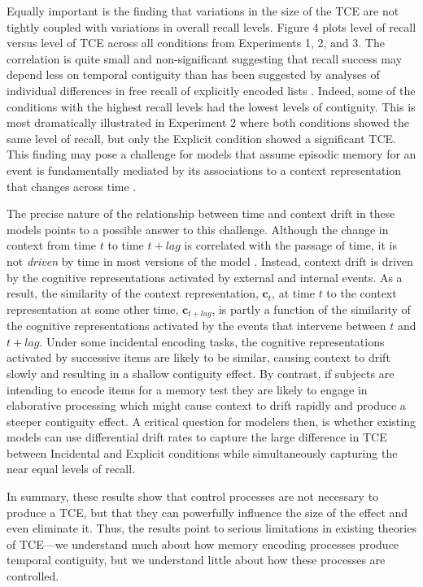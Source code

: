 \documentclass[jou,natbib,floatsintext]{apa6} %
\begin{document}
Equally important is the finding that variations in the size of the TCE are not tightly coupled with variations in overall recall levels. Figure 4 plots level of recall versus level of TCE across all conditions from Experiments 1, 2, and 3. \label{done-12} \color{red} The correlation is quite small and non-significant \color{black} suggesting that recall success may depend less on temporal contiguity than has been suggested by analyses of individual differences in free recall of explicitly encoded lists \citep{SedeEtal10,HealEtal14}. Indeed, some of the conditions with the highest recall levels had the lowest levels of contiguity. This is most dramatically illustrated in Experiment 2 where both conditions showed the same level of recall, but only the Explicit condition showed a significant TCE. This finding may pose a challenge for models that assume episodic memory for an event is fundamentally mediated by its associations to a context representation that changes across time \citep[e.g.,][]{LohnEtal14,HealKaha15}. 

The precise nature of the relationship between time and context drift in these models points to a possible answer to this challenge. Although the change in context from time $t$ to time $t+lag$ is correlated with the passage of time, it is not \emph{driven} by time in most versions of the model \citep[but see][for a model in which drift is driven by time]{HowaEtal14a}. Instead, context drift is driven by the cognitive representations activated by external and internal events. As a result, the similarity of the context representation, $\mathbf{c}_t$, at time $t$ to the context representation at some other time, $\mathbf{c}_{t+lag}$, is partly a function of the similarity of the cognitive representations activated by the events that intervene between $t$ and $t+lag$. Under some incidental encoding tasks, the cognitive representations activated by successive items are likely to be similar, causing context to drift slowly and resulting in a shallow contiguity effect. By contrast, if subjects are intending to encode items for a memory test they are likely to engage in elaborative processing which might cause context to drift rapidly and produce a steeper contiguity effect. A critical question for modelers then, is whether existing models can use differential drift rates to capture the large difference in TCE between Incidental and Explicit conditions while simultaneously capturing the near equal levels of recall.

In summary, these results show that control processes are not necessary to produce a TCE, but that they can powerfully influence the size of the effect and even eliminate it. Thus, the results point to serious limitations in existing theories of TCE---we understand much about how memory encoding processes produce temporal contiguity, but we understand little about how these processes are controlled.


\end{document}
